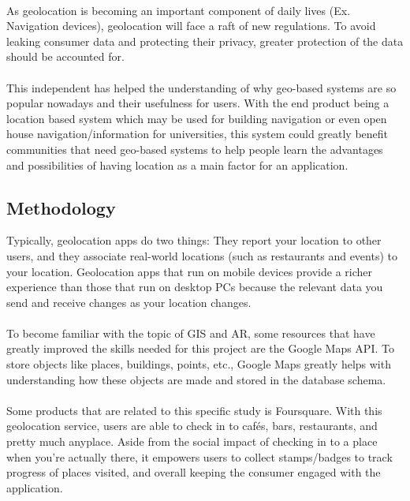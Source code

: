 \paragraph{} As geolocation is becoming an important component of daily lives (Ex. Navigation devices), geolocation will face a raft of new regulations. To avoid leaking consumer data and protecting their privacy, greater protection of the data should be accounted for.
\paragraph{} This independent has helped the understanding of why geo-based systems are so popular nowadays and their usefulness for users. With the end product being a location based system which may be used for building navigation or even open house navigation/information for universities, this system could greatly benefit communities that need geo-based systems to help people learn the advantages and possibilities of having location as a main factor for an application.
\subsection{Methodology}
Typically, geolocation apps do two things: They report your location to other users, and they associate real-world locations (such as restaurants and events) to your location. Geolocation apps that run on mobile devices provide a richer experience than those that run on desktop PCs because the relevant data you send and receive changes as your location changes.
\paragraph{} To become familiar with the topic of GIS and AR, some resources that have greatly improved the skills needed for this project are the Google Maps API. To store objects like places, buildings, points, etc., Google Maps greatly helps with understanding how these objects are made and stored in the database schema.
\paragraph{} Some products that are related to this specific study is Foursquare. With this geolocation service, users are able to check in to cafés, bars, restaurants, and pretty much anyplace. Aside from the social impact of checking in to a place when you’re actually there, it empowers users to collect stamps/badges to track progress of places visited, and overall keeping the consumer engaged with the application.
